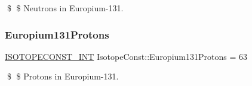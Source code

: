 \$ \$ Neutrons in Europium-\/131. \mbox{\label{group___isotope_const-_europium-_eu131_ga27fd2685383f7e273e383605ec65302d}} 
\subsubsection{\texorpdfstring{Europium131\+Protons}{Europium131Protons}}
{\footnotesize\ttfamily \mbox{\hyperlink{group___isotope_const-_macros_ga5f18360b3e99483a35c32d789e62621c}{I\+S\+O\+T\+O\+P\+E\+C\+O\+N\+S\+T\+\_\+\+I\+NT}} Isotope\+Const\+::\+Europium131\+Protons = 63}

\$ \$ Protons in Europium-\/131. 